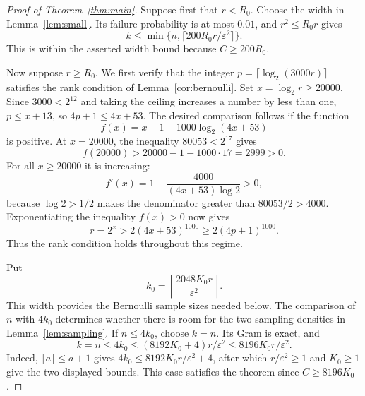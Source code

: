 \documentclass[11pt]{article}
\theoremstyle{definition}
\theoremstyle{remark}
\theoremstyle{plain}
\begin{document}
\begin{proof}[Proof of Theorem~\ref{thm:main}]
Suppose first that $r<R_0$. Choose the width in
Lemma~\ref{lem:small}. Its failure probability is at most $0.01$,
and $r^2\le R_0r$ gives
\[
 k\le\min\{n,\lceil200R_0r/\varepsilon^2\rceil\}.
\]
This is within the asserted width bound because $C\ge200R_0$.

Now suppose $r\ge R_0$. We first verify that the
integer \(p=\lceil\log_2(3000r)\rceil\) satisfies the rank condition
of Lemma~\ref{cor:bernoulli}. Set $x=\log_2r\ge20000$.
Since $3000<2^{12}$ and taking the ceiling increases a number by
less than one, $p\le x+13$, so $4p+1\le4x+53$.
The desired comparison follows if the function
\[
 f(x)=x-1-1000\log_2(4x+53)
\]
is positive. At $x=20000$, the inequality $80053<2^{17}$ gives
\[
 f(20000)>20000-1-1000\cdot17=2999>0.
\]
For all $x\ge20000$ it is increasing:
\[
 f'(x)=1-\frac{4000}{(4x+53)\log2}>0,
\]
because $\log2>1/2$ makes the denominator greater than
$80053/2>4000$. Exponentiating the inequality $f(x)>0$ now gives
\[
 r=2^x>2(4x+53)^{1000}\ge2(4p+1)^{1000}.
\]
Thus the rank condition holds throughout this regime.

Put
\begin{equation}\label{eq:large-rank-width}
                    k_0=\left\lceil
                            \frac{2048K_0r}{\varepsilon^2}
                          \right\rceil.
\end{equation}
This width provides the Bernoulli sample sizes needed below. The
comparison of $n$ with $4k_0$ determines whether there is room for
the two sampling densities in Lemma~\ref{lem:sampling}.
If \(n\le4k_0\), choose \(k=n\). Its Gram is exact, and
\begin{equation}\label{eq:full-width-bound}
 k=n\le4k_0\le(8192K_0+4)r/\varepsilon^2
                         \le8196K_0r/\varepsilon^2.
\end{equation}
Indeed, $\lceil a\rceil\le a+1$ gives
$4k_0\le8192K_0r/\varepsilon^2+4$, after which
$r/\varepsilon^2\ge1$ and $K_0\ge1$ give the two displayed bounds.
This case satisfies the theorem since $C\ge8196K_0$.


\end{proof}
\end{document}
